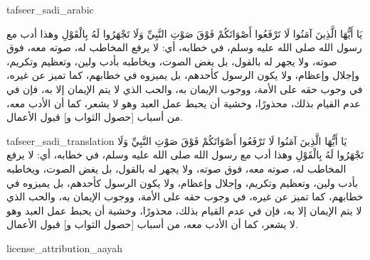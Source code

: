 \begin{taggedblock}{tafseer_sadi_arabic}
\begin{Arabic}
{ يَا أَيُّهَا الَّذِينَ آمَنُوا لَا تَرْفَعُوا أَصْوَاتَكُمْ فَوْقَ صَوْتِ النَّبِيِّ وَلَا تَجْهَرُوا لَهُ بِالْقَوْلِ }
وهذا أدب مع رسول الله صلى الله عليه وسلم، في خطابه، أي: لا يرفع المخاطب له، صوته معه، فوق صوته، ولا يجهر له بالقول، بل يغض الصوت، ويخاطبه بأدب ولين، وتعظيم وتكريم، وإجلال وإعظام، ولا يكون الرسول كأحدهم، بل يميزوه في خطابهم، كما تميز عن غيره، في وجوب حقه على الأمة، ووجوب الإيمان به، والحب الذي لا يتم الإيمان إلا به، فإن في عدم القيام بذلك، محذورًا، وخشية أن يحبط عمل العبد وهو لا يشعر، كما أن الأدب معه، من أسباب
[حصول الثواب و]
قبول الأعمال.
\end{Arabic}
\end{taggedblock}
\begin{taggedblock}{tafseer_sadi_translation}
{ يَا أَيُّهَا الَّذِينَ آمَنُوا لَا تَرْفَعُوا أَصْوَاتَكُمْ فَوْقَ صَوْتِ النَّبِيِّ وَلَا تَجْهَرُوا لَهُ بِالْقَوْلِ }
وهذا أدب مع رسول الله صلى الله عليه وسلم، في خطابه، أي: لا يرفع المخاطب له، صوته معه، فوق صوته، ولا يجهر له بالقول، بل يغض الصوت، ويخاطبه بأدب ولين، وتعظيم وتكريم، وإجلال وإعظام، ولا يكون الرسول كأحدهم، بل يميزوه في خطابهم، كما تميز عن غيره، في وجوب حقه على الأمة، ووجوب الإيمان به، والحب الذي لا يتم الإيمان إلا به، فإن في عدم القيام بذلك، محذورًا، وخشية أن يحبط عمل العبد وهو لا يشعر، كما أن الأدب معه، من أسباب
[حصول الثواب و]
قبول الأعمال.
\end{taggedblock}
\begin{taggedblock}{license_attribution_aayah}

\end{taggedblock}
\begin{comment}
Please use the following for footnotes:- Sample\footnoteQ{Text of Qur'an footnote goes here.}.
Sample\footnoteT{Text of Tafseer footnote goes here.}.
\end{comment}